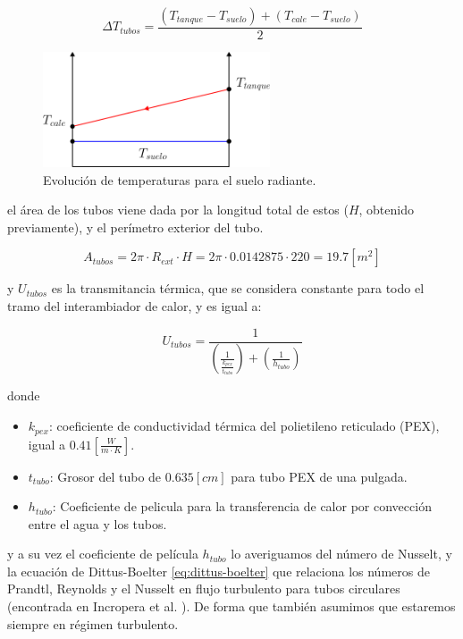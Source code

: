 \begin{equation} \label{eq:mean_delta_T}
	\Delta T_{tubos} = \frac{(T_{tanque} - T_{suelo}) + (T_{cale} - T_{suelo})}{2}
\end{equation}

\begin{figure}[h] \centering
	\centering
	\includegraphics[width=0.6\textwidth]{./capitulos/resultados_discusion/images/floor_temperatures.png}
	\caption{Evolución de temperaturas para el suelo radiante.}
	\label{fig:floor_temperatures}
\end{figure}

el área de los tubos viene dada por la longitud total de estos ($H$, obtenido previamente), y el perímetro
exterior del tubo.

\begin{equation}
	A_{tubos} = 2 \pi \cdot R_{ext} \cdot H = 2 \pi \cdot 0.0142875 \cdot 220 = 19.7[m^2]
\end{equation}


y $U_{tubos}$ es la transmitancia térmica, que se considera constante para todo
el tramo del interambiador de calor, y es igual a:

\begin{equation}
	U_{tubos} = \frac{1}{\left( \frac{1}{\frac{k_{pex}}{t_{tubo}}} \right) + \left( \frac{1}{h_{tubo}} \right)}
\end{equation}

donde

\begin{itemize}
	\item $k_{pex}$: coeficiente de conductividad térmica del polietileno reticulado (PEX), igual a $0.41\left[ \frac{W}{m \cdot K} \right]$.
	\item $t_{tubo}$: Grosor del tubo de $0.635[cm]$ para tubo PEX de una pulgada.
	\item $h_{tubo}$: Coeficiente de pelicula para la transferencia de calor por convección entre el agua y los tubos.
\end{itemize}

y a su vez el coeficiente de película $h_{tubo}$ lo averiguamos del número de
Nusselt, y la ecuación de Dittus-Boelter \eqref{eq:dittus-boelter} que
relaciona los números de Prandtl, Reynolds y el Nusselt en flujo turbulento
para tubos circulares (encontrada en Incropera et al.
\cite{incropera1996fundamentals}). De forma que también asumimos que estaremos
siempre en régimen turbulento.

